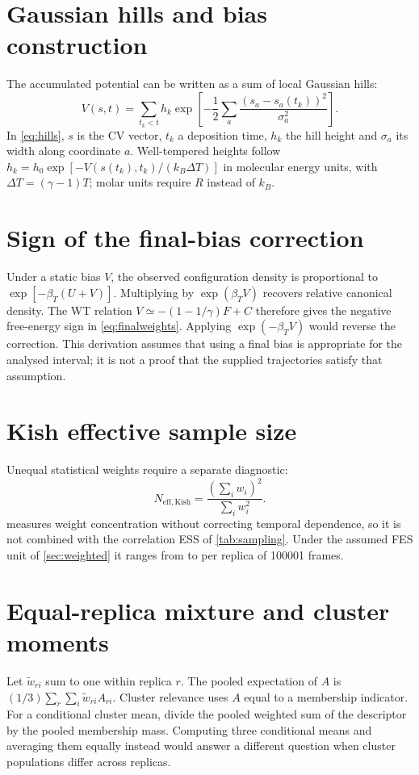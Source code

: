 \section*{Gaussian hills and bias construction}
The accumulated potential can be written as a sum of local Gaussian hills:
\begin{equation}
V(s,t)=\sum_{t_k<t}h_k\exp\!\left[-\frac12\sum_a\frac{(s_a-s_a(t_k))^2}{\sigma_a^2}\right].
\label{eq:hills}
\end{equation}
In \cref{eq:hills}, $s$ is the CV vector, $t_k$ a deposition time, $h_k$ the hill height and $\sigma_a$ its width along coordinate $a$. Well-tempered heights follow $h_k=h_0\exp[-V(s(t_k),t_k)/(k_B\Delta T)]$ in molecular energy units, with $\Delta T=(\gamma-1)T$; molar units require $R$ instead of $k_B$.

\section*{Sign of the final-bias correction}
Under a static bias $V$, the observed configuration density is proportional to $\exp[-\beta_T(U+V)]$. Multiplying by $\exp(\beta_T V)$ recovers relative canonical density. The WT relation $V\simeq-(1-1/\gamma)F+C$ therefore gives the negative free-energy sign in \cref{eq:finalweights}. Applying $\exp(-\beta_T V)$ would reverse the correction. This derivation assumes that using a final bias is appropriate for the analysed interval; it is not a proof that the supplied trajectories satisfy that assumption.

\section*{Kish effective sample size}
Unequal statistical weights require a separate diagnostic:
\begin{equation}
N_{\mathrm{eff,Kish}}=\frac{(\sum_i w_i)^2}{\sum_i w_i^2}.
\label{eq:kish}
\end{equation}
 measures weight concentration without correcting temporal dependence, so it is not combined with the correlation ESS of \cref{tab:sampling}. Under the assumed FES unit of \cref{sec:weighted} it ranges from \WKishMin{} to \WKishMax{} per replica of \num{100001} frames.

\section*{Equal-replica mixture and cluster moments}
Let $\widetilde w_{ri}$ sum to one within replica $r$. The pooled expectation of $A$ is $(1/3)\sum_r\sum_i\widetilde w_{ri}A_{ri}$. Cluster relevance uses $A$ equal to a membership indicator. For a conditional cluster mean, divide the pooled weighted sum of the descriptor by the pooled membership mass. Computing three conditional means and averaging them equally instead would answer a different question when cluster populations differ across replicas.

